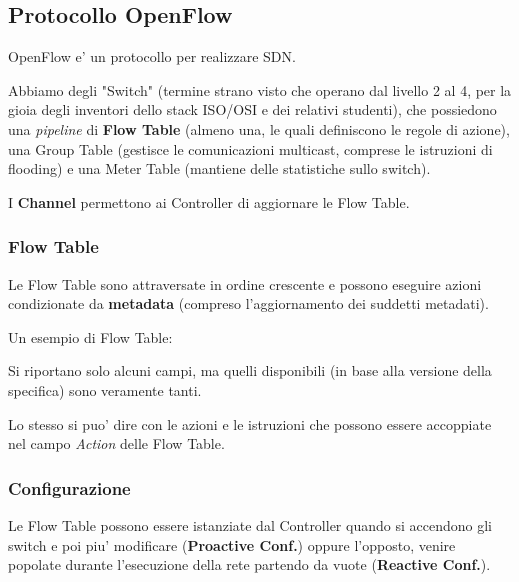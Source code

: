 

\subsection{Protocollo OpenFlow}

OpenFlow e' un protocollo per realizzare SDN.

Abbiamo degli "Switch" (termine strano visto che operano dal livello 2 al 4, per la gioia degli inventori dello stack ISO/OSI e dei relativi studenti), che possiedono una \textit{pipeline} di \textbf{Flow Table} (almeno una, le quali definiscono le regole di azione), una Group Table (gestisce le comunicazioni multicast, comprese le istruzioni di flooding) e una Meter Table (mantiene delle statistiche sullo switch).

I \textbf{Channel} permettono ai Controller di aggiornare le Flow Table.


\subsubsection{Flow Table}

Le Flow Table sono attraversate in ordine crescente e possono eseguire azioni condizionate da \textbf{metadata} (compreso l'aggiornamento dei suddetti metadati).


Un esempio di Flow Table:


Si riportano solo alcuni campi, ma quelli disponibili (in base alla versione della specifica) sono veramente tanti.


Lo stesso si puo' dire con le azioni e le istruzioni che possono essere accoppiate nel campo \textit{Action} delle Flow Table.


\subsubsection{Configurazione}

Le Flow Table possono essere istanziate dal Controller quando si accendono gli switch e poi piu' modificare (\textbf{Proactive Conf.}) oppure l'opposto, venire popolate durante l'esecuzione della rete partendo da vuote (\textbf{Reactive Conf.}).

